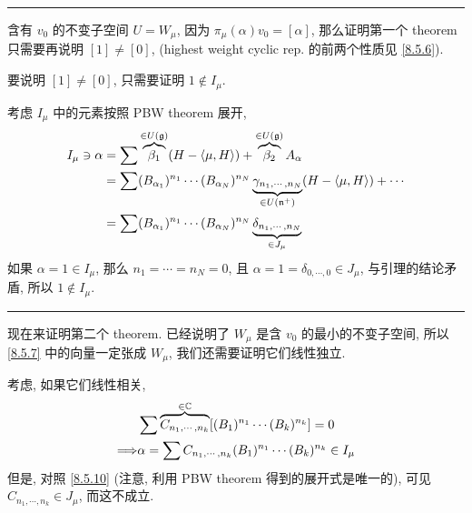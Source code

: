 \begin{itemize}
\begin{tcolorbox}[title=proof:]
		\noindent\rule[0.5ex]{\linewidth}{0.5pt} %
		
		含有 $v_0$ 的不变子空间 $U = W_\mu$, 因为 $\pi_\mu(\alpha) v_0 = [\alpha]$, 那么证明第一个 theorem 只需要再说明 $[1] \neq [0]$, (highest weight cyclic rep. 的前两个性质见 \eqref{8.5.6}).
		
		\noindent\hdashrule[0.5ex]{\linewidth}{0.5pt}{1mm} %
		
		要说明 $[1] \neq [0]$, 只需要证明 $1 \notin I_\mu$.
		
		考虑 $I_\mu$ 中的元素按照 PBW theorem 展开,
		\begin{align}
			I_\mu \ni \alpha &= \sum \overbrace{\beta_1}^{\in U(\mathfrak{g})} (H - \braket{\mu, H}) + \overbrace{\beta_2}^{\in U(\mathfrak{g})} A_\alpha \notag \\
			&= \sum (B_{\alpha_1})^{n_1} \cdots (B_{\alpha_N})^{n_N} \underbrace{\gamma_{n_1, \cdots, n_N}}_{\in U(\mathfrak{n}^+)} (H - \braket{\mu, H}) + \cdots \notag \\
			&= \sum (B_{\alpha_1})^{n_1} \cdots (B_{\alpha_N})^{n_N} \underbrace{\delta_{n_1, \cdots, n_N}}_{\in J_\mu} \label{8.5.10}
		\end{align}
		如果 $\alpha = 1 \in I_\mu$, 那么 $n_1 = \cdots = n_N = 0$, 且 $\alpha = 1 = \delta_{0, \cdots, 0} \in J_\mu$, 与引理的结论矛盾, 所以 $1 \notin I_\mu$.
		
		\noindent\rule[0.5ex]{\linewidth}{0.5pt} %
		
		现在来证明第二个 theorem. 已经说明了 $W_\mu$ 是含 $v_0$ 的最小的不变子空间, 所以 \eqref{8.5.7} 中的向量一定张成 $W_\mu$, 我们还需要证明它们线性独立.
		
		考虑, 如果它们线性相关,
		\begin{align}
			& \sum \overbrace{C_{n_1, \cdots, n_k}}^{\in \mathbb{C}} [(B_1)^{n_1} \cdots (B_k)^{n_k}] = 0 \notag \\
			\Longrightarrow & \alpha = \sum C_{n_1, \cdots, n_k} (B_1)^{n_1} \cdots (B_k)^{n_k} \in I_\mu
		\end{align}
		但是, 对照 \eqref{8.5.10} (注意, 利用 PBW theorem 得到的展开式是唯一的), 可见 $C_{n_1, \cdots, n_k} \in J_\mu$, 而这不成立.
	\end{tcolorbox}
\end{itemize}

